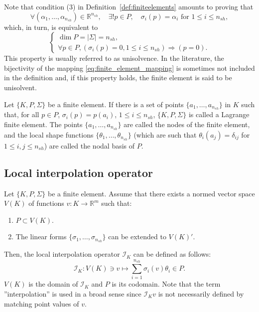 Note that condition (3) in Definition~\ref{def:finiteelements} amounts to proving that
    \begin{equation*}
\forall(\alpha_1, \dots, \alpha_{n_{sh}}) \in \mathbb{R}^{n_{sh}}, \quad \exists ! p \in P, \quad \sigma_i(p) = \alpha_i \text{ for } 1 \le i \le n_{sh},
\end{equation*}
    which, in turn, is equivalent to
    \begin{equation*}
\begin{cases} \dim P = |\Sigma| = n_{sh}, \\ \forall p \in P, (\sigma_i(p) = 0, 1 \le i \le n_{sh}) \Rightarrow (p = 0). \end{cases}
\end{equation*}
This property is usually referred to as unisolvence. In the literature, the bijectivity of the mapping \eqref{eq:finite_element_mapping} is sometimes not included in the definition and, if this property holds, the finite element is said to be unisolvent.

\begin{definition}\label{def:lagrange_finite_element}
    Let $\{K, P, \Sigma\}$ be a finite element. If there is a set of points $\{a_1, \dots, a_{n_{sh}}\}$ in $K$ such that, for all $p \in P$, $\sigma_i(p) = p(a_i)$, $1 \le i \le n_{sh}$, $\{K, P, \Sigma\}$ is called a Lagrange finite element. The points $\{a_1, \dots, a_{n_{sh}}\}$ are called the nodes of the finite element, and the local shape functions $\{\theta_1, \dots, \theta_{n_{sh}}\}$ (which are such that $\theta_i(a_j) = \delta_{ij}$ for $1 \le i,j \le n_{sh}$) are called the nodal basis of $P$.
\end{definition}

\subsection{Local interpolation operator}
Let $\{K, P, \Sigma\}$ be a finite element. Assume that there exists a normed vector space $V(K)$ of functions $v: K \rightarrow \mathbb{R}^m$ such that:
\begin{enumerate}
    \item $P \subset V(K)$.
    \item The linear forms $\{\sigma_1, \dots, \sigma_{n_{sh}}\}$ can be extended to $V(K)'$.
\end{enumerate}
Then, the local interpolation operator $\mathcal{I}_K$ can be defined as follows:
\begin{equation*}
\mathcal{I}_K: V(K) \ni v \mapsto \sum_{i=1}^{n_{sh}} \sigma_i(v) \theta_i \in P.
\end{equation*}
$V(K)$ is the domain of $\mathcal{I}_K$ and $P$ is its codomain. Note that the term ''interpolation'' is used in a broad sense since $\mathcal{I}_K v$ is not necessarily defined by matching point values of $v$.

